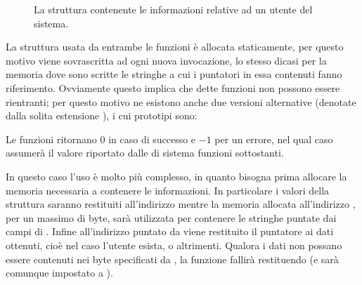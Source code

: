 \begin{figure}[!htb]
  \footnotesize
  \centering
  \begin{minipage}[c]{0.8\textwidth}
  \end{minipage} 
  \normalsize 
  \caption{La struttura  contenente le informazioni relative
    ad un utente del sistema.}
  \label{fig:sys_passwd_struct}
\end{figure}

La struttura usata da entrambe le funzioni è allocata staticamente, per questo
motivo viene sovrascritta ad ogni nuova invocazione, lo stesso dicasi per la
memoria dove sono scritte le stringhe a cui i puntatori in essa contenuti
fanno riferimento. Ovviamente questo implica che dette funzioni non possono
essere rientranti; per questo motivo ne esistono anche due versioni
alternative (denotate dalla solita estensione ), i cui prototipi
sono:

\begin{funcproto}{
}

{Le funzioni ritornano $0$ in caso di successo e $-1$ per un errore, nel qual
  caso  assumerà il valore riportato dalle di sistema funzioni
  sottostanti.}
\end{funcproto}

In questo caso l'uso è molto più complesso, in quanto bisogna prima allocare
la memoria necessaria a contenere le informazioni. In particolare i valori
della struttura  saranno restituiti all'indirizzo
 mentre la memoria allocata all'indirizzo , per
un massimo di  byte, sarà utilizzata per contenere le stringhe
puntate dai campi di . Infine all'indirizzo puntato da
 viene restituito il puntatore ai dati ottenuti, cioè
 nel caso l'utente esista, o  altrimenti.  Qualora i
dati non possano essere contenuti nei byte specificati da , la
funzione fallirà restituendo  (e  sarà comunque
impostato a ).

